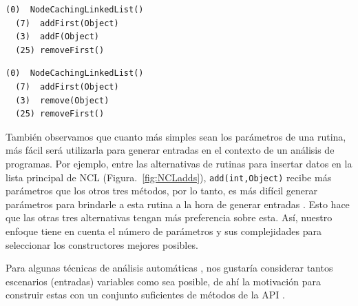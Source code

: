 \begin{lstlisting}[numbers=none,label=fig:NCLnoMin, frame=tb , basicstyle=\scriptsize]
  (0)  NodeCachingLinkedList()
  (7)  addFirst(Object)
  (3)  addF(Object)
  (25) removeFirst()
\end{lstlisting}

\begin{lstlisting}[numbers=none,label=fig:NCLnoMin1, caption= Conjuntos de metodos builders suficientes pero no mínimos, captionpos=b, frame=tb , basicstyle=\scriptsize]
  (0)  NodeCachingLinkedList()
  (7)  addFirst(Object)
  (3)  remove(Object)
  (25) removeFirst()
\end{lstlisting}

También observamos que cuanto más simples sean los parámetros de una rutina, más
fácil será utilizarla para generar entradas en el contexto de un análisis de
programas. Por ejemplo, entre las alternativas de rutinas para insertar datos en
la lista principal de NCL (Figura.~\ref{fig:NCLadds}), \texttt{add(int,Object)}
recibe más parámetros que los otros tres métodos, por lo tanto, es más difícil generar parámetros para brindarle a esta rutina a la hora de generar entradas . Esto hace que las otras tres alternativas tengan más preferencia sobre esta. Así, nuestro enfoque tiene en cuenta el número de parámetros y sus complejidades para seleccionar los constructores mejores posibles.

Para algunas técnicas de análisis automáticas , nos gustaría considerar tantos escenarios (entradas) variables como sea posible, de ahí la motivación para construir estas con un conjunto suficientes de métodos de la API 
.


